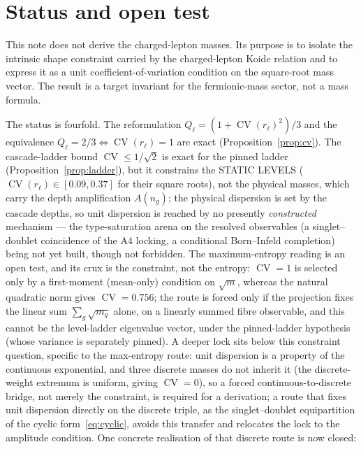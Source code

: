 \documentclass[11pt]{article}
\theoremstyle{definition}
\theoremstyle{remark}
\newcommand{\CV}{\operatorname{CV}}
\newcommand{\rl}{r_{\ell}}
\begin{document}
  \section{Status and open test}
    \label{sec:status}

    This note does not derive the charged-lepton masses.
    Its purpose is to isolate the intrinsic shape constraint carried by the charged-lepton Koide relation and to
    express it as a unit coefficient-of-variation condition on the square-root mass vector.
    The result is a target invariant for the fermionic-mass sector, not a mass formula.

    The status is fourfold.
    The reformulation $Q_\ell = (1 + \CV(\rl)^2)/3$ and the equivalence $Q_\ell = 2/3 \iff \CV(\rl) = 1$ are exact
    (Proposition~\ref{prop:cv}).
    The cascade-ladder bound $\CV \le 1/\sqrt2$ is exact for the pinned ladder (Proposition~\ref{prop:ladder}), but
    it constrains the STATIC LEVELS ($\CV(\rl) \in [0.09, 0.37]$ for their square roots), not the physical masses,
    which carry the depth amplification $A(n_g)$; the physical dispersion is set by the cascade depths, so unit
    dispersion is reached by no presently \emph{constructed} mechanism --- the type-saturation arena on the
    resolved observables (a singlet--doublet coincidence of the A4 locking, a conditional Born--Infeld completion) being not yet built, though not
    forbidden.
    The maximum-entropy reading is an open test, and its crux is the constraint, not the entropy: $\CV = 1$ is
    selected only by a first-moment (mean-only) condition on $\sqrt m$, whereas the natural quadratic norm gives
    $\CV = 0.756$; the route is forced only if the projection fixes the linear sum $\sum_g \sqrt{m_g}$ alone, on a
    linearly summed fibre observable, and this cannot be the level-ladder eigenvalue vector, under the pinned-ladder hypothesis (whose variance is
    separately pinned).
    A deeper lock sits below this constraint question, specific to the max-entropy route: unit dispersion is a
    property of the continuous exponential, and three discrete masses do not inherit it (the discrete-weight
    extremum is uniform, giving $\CV = 0$), so a forced continuous-to-discrete bridge, not merely the constraint, is
    required for a derivation; a route that fixes unit dispersion directly on the discrete triple, as the
    singlet--doublet equipartition of the cyclic form~\eqref{eq:cyclic}, avoids this transfer and relocates the lock
    to the amplitude condition.
    One concrete realisation of that discrete route is now closed:
\end{document}

